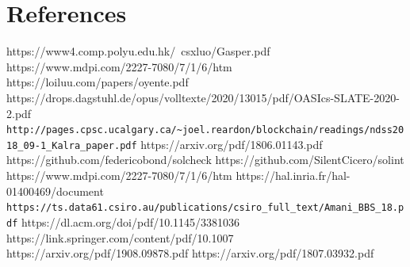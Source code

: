 \documentclass[letterpaper,twocolumn,10pt]{article}
\begin{document}
\section{References}
https://www4.comp.polyu.edu.hk/~csxluo/Gasper.pdf
\linebreak
\linebreak
https://www.mdpi.com/2227-7080/7/1/6/htm
\linebreak
\linebreak
https://loiluu.com/papers/oyente.pdf
\linebreak
\linebreak
https://drops.dagstuhl.de/opus/volltexte/2020/13015/pdf/OASIcs-SLATE-2020-2.pdf
\linebreak
\linebreak
\verb|http://pages.cpsc.ucalgary.ca/~joel.reardon/blockchain/readings/ndss2018_09-1_Kalra_paper.pdf|
\linebreak
\linebreak
https://arxiv.org/pdf/1806.01143.pdf
\linebreak
\linebreak
https://github.com/federicobond/solcheck
\linebreak
\linebreak
https://github.com/SilentCicero/solint
\linebreak
\linebreak
https://www.mdpi.com/2227-7080/7/1/6/htm
\linebreak
\linebreak
https://hal.inria.fr/hal-01400469/document
\linebreak
\linebreak
\verb|https://ts.data61.csiro.au/publications/csiro_full_text/Amani_BBS_18.pdf|
\linebreak
\linebreak
https://dl.acm.org/doi/pdf/10.1145/3381036
\linebreak
\linebreak
https://link.springer.com/content/pdf/10.1007%
\linebreak
\linebreak
https://arxiv.org/pdf/1908.09878.pdf
\linebreak
\linebreak
https://arxiv.org/pdf/1807.03932.pdf
\linebreak





\end{document}
